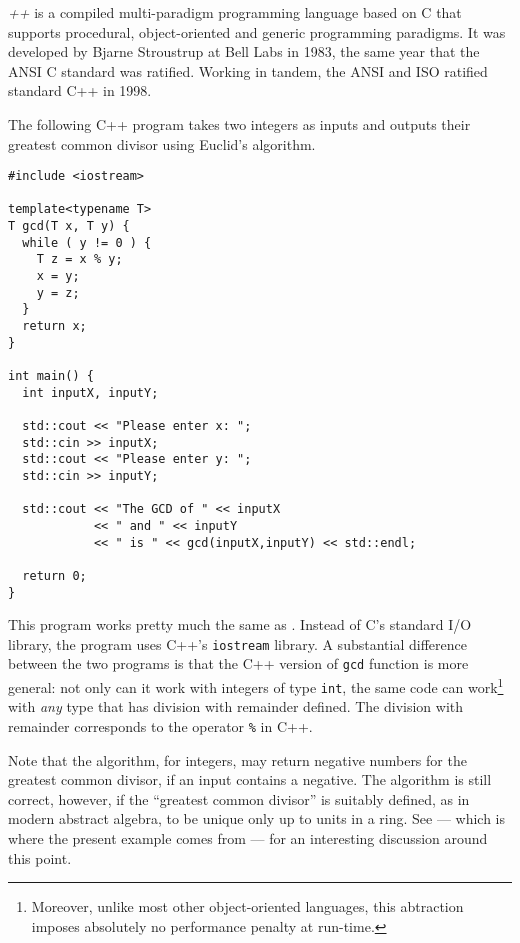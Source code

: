 \documentclass[12pt]{article}
\begin{document}

{\em {}++} is a compiled multi-paradigm programming language based on C that supports procedural, object-oriented and generic programming paradigms. It was developed by Bjarne Stroustrup at Bell Labs in 1983, the same year that the ANSI C standard was ratified. Working in tandem, the ANSI and ISO ratified standard C++ in 1998.

The following C++ program takes two integers as inputs and outputs their greatest common divisor using Euclid's algorithm.

\begin{verbatim}
#include <iostream> 

template<typename T>
T gcd(T x, T y) {
  while ( y != 0 ) {
    T z = x % y;
    x = y;
    y = z;
  }
  return x;
}

int main() { 
  int inputX, inputY; 

  std::cout << "Please enter x: ";
  std::cin >> inputX; 
  std::cout << "Please enter y: ";
  std::cin >> inputY; 

  std::cout << "The GCD of " << inputX 
            << " and " << inputY 
            << " is " << gcd(inputX,inputY) << std::endl; 

  return 0;
}
\end{verbatim}

This program works pretty much the same as 
.
Instead of C's standard I/O library, the program uses 
C++'s \verb=iostream= library. 
A substantial difference between the two programs
is that the C++ version of \verb=gcd= function is more general:
not only can it work with integers of type \verb=int=,
the same code can work\footnote{
Moreover, unlike most other object-oriented languages,
this abtraction imposes absolutely no performance penalty at run-time.}
with \emph{any} type that has
division with remainder defined.
The division with remainder corresponds to the operator \verb=%= in C++.

Note that the algorithm, for integers, may return negative 
numbers for the greatest common divisor, if an input contains a negative.
The algorithm is still correct, however, if the ``greatest common divisor''
is suitably defined, as in modern abstract algebra, 
to be unique only up to units in a ring.
See \cite{Stepanov} --- which is where the present example comes from ---
 for an interesting discussion around this point.
\end{document}
